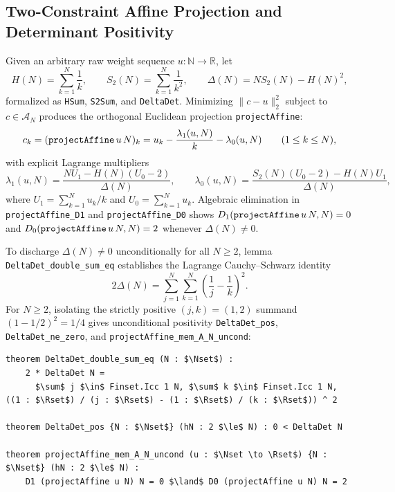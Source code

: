 \documentclass[11pt,a4paper]{article}
\theoremstyle{definition}
\newcommand{\Nset}{\mathbb{N}}
\newcommand{\Rset}{\mathbb{R}}
\begin{document}
\subsection{Two-Constraint Affine Projection and Determinant Positivity}

Given an arbitrary raw weight sequence $u : \Nset \to \Rset$, let
\begin{equation}
H(N) = \sum_{k=1}^N \frac{1}{k}, \qquad S_2(N) = \sum_{k=1}^N \frac{1}{k^2}, \qquad \Delta(N) = N S_2(N) - H(N)^2,
\end{equation}
formalized as \texttt{HSum}, \texttt{S2Sum}, and \texttt{DeltaDet}. Minimizing $\|c - u\|_2^2$ subject to $c \in \mathcal{A}_N$ produces the orthogonal Euclidean projection \texttt{projectAffine}:
\begin{equation}\label{eq:projectAffine}
c_k = (\text{\texttt{projectAffine}}\, u\, N)_k = u_k - \frac{\lambda_1(u, N)}{k} - \lambda_0(u, N) \qquad (1 \le k \le N),
\end{equation}
with explicit Lagrange multipliers
\begin{equation}
\lambda_1(u, N) = \frac{N U_1 - H(N)(U_0 - 2)}{\Delta(N)}, \qquad \lambda_0(u, N) = \frac{S_2(N)(U_0 - 2) - H(N) U_1}{\Delta(N)},
\end{equation}
where $U_1 = \sum_{k=1}^N u_k/k$ and $U_0 = \sum_{k=1}^N u_k$. Algebraic elimination in \texttt{projectAffine\_D1} and \texttt{projectAffine\_D0} shows $D_1(\text{\texttt{projectAffine}}\, u\, N, N) = 0$ and $D_0(\text{\texttt{projectAffine}}\, u\, N, N) = 2$ whenever $\Delta(N) \ne 0$.

To discharge $\Delta(N) \ne 0$ unconditionally for all $N \ge 2$, lemma \texttt{DeltaDet\_double\_sum\_eq} establishes the Lagrange Cauchy--Schwarz identity
\begin{equation}
2 \Delta(N) = \sum_{j=1}^N \sum_{k=1}^N \left(\frac{1}{j} - \frac{1}{k}\right)^2.
\end{equation}
For $N \ge 2$, isolating the strictly positive $(j, k) = (1, 2)$ summand $(1 - 1/2)^2 = 1/4$ gives unconditional positivity \texttt{DeltaDet\_pos}, \texttt{DeltaDet\_ne\_zero}, and \texttt{projectAffine\_mem\_A\_N\_uncond}:
\begin{lstlisting}
theorem DeltaDet_double_sum_eq (N : $\Nset$) :
    2 * DeltaDet N =
      $\sum$ j $\in$ Finset.Icc 1 N, $\sum$ k $\in$ Finset.Icc 1 N, ((1 : $\Rset$) / (j : $\Rset$) - (1 : $\Rset$) / (k : $\Rset$)) ^ 2

theorem DeltaDet_pos {N : $\Nset$} (hN : 2 $\le$ N) : 0 < DeltaDet N

theorem projectAffine_mem_A_N_uncond (u : $\Nset \to \Rset$) {N : $\Nset$} (hN : 2 $\le$ N) :
    D1 (projectAffine u N) N = 0 $\land$ D0 (projectAffine u N) N = 2
\end{lstlisting}
\end{document}
